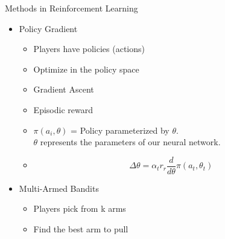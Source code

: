 \documentclass{IFES-beamer}
\begin{document}
    \begin{frame}{Methods in Reinforcement Learning}
        \begin{itemize}
            \item Policy Gradient
                \begin{itemize}
                    \item Players have policies (actions)
                    \item Optimize in the policy space
                    \item Gradient Ascent 
                    \item Episodic reward
                    \item $\pi(a_i, \theta)$ = Policy parameterized by $\theta$. \\
                    $\theta$ represents the parameters of our neural network.
                    \item $$\Delta \theta = \alpha_t r_r \frac{d}{d \theta} \pi(a_t, \theta_t)$$
                \end{itemize}
            \item Multi-Armed Bandits
                \begin{itemize}
                    \item Players pick from k arms
                    \item Find the best arm to pull
                \end{itemize}
        \end{itemize}
    \end{frame}

    
\end{document}
